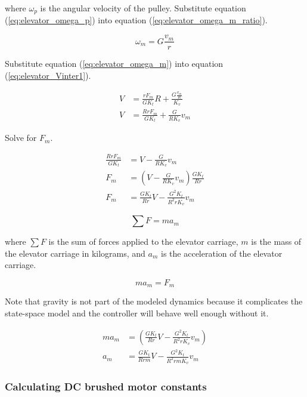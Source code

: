 where $\omega_p$ is the angular velocity of the pulley. Substitute equation
(\ref{eq:elevator_omega_p}) into equation (\ref{eq:elevator_omega_m_ratio}).

\begin{equation}
  \omega_m = G \frac{v_m}{r} \label{eq:elevator_omega_m}
\end{equation}

Substitute equation (\ref{eq:elevator_omega_m}) into equation
(\ref{eq:elevator_Vinter1}).

\begin{align*}
  V &= \frac{rF_m}{GK_t} R + \frac{G \frac{v_m}{R}}{K_v} \\
  V &= \frac{RrF_m}{GK_t} + \frac{G}{RK_v} v_m
\end{align*}

Solve for $F_m$.

\begin{align}
  \frac{RrF_m}{GK_t} &= V - \frac{G}{RK_v} v_m \nonumber \\
  F_m &= \left(V - \frac{G}{RK_v} v_m\right) \frac{GK_t}{Rr} \nonumber \\
  F_m &= \frac{GK_t}{Rr} V - \frac{G^2K_t}{R^2 rK_v} v_m \label{eq:elevator_F_m}
\end{align}

\begin{equation}
  \sum F = ma_m \label{eq:elevator_F_ma}
\end{equation}

where $\sum F$ is the sum of forces applied to the elevator carriage, $m$ is
the mass of the elevator carriage in kilograms, and $a_m$ is the acceleration of
the elevator carriage.

\begin{equation*}
  ma_m = F_m
\end{equation*}

Note that gravity is not part of the modeled dynamics because it complicates the
state-space model and the controller will behave well enough without it.

\begin{align}
  ma_m &= \left(\frac{GK_t}{Rr} V - \frac{G^2K_t}{R^2 rK_v} v_m\right)
    \nonumber \\
  a_m &= \frac{GK_t}{Rrm} V - \frac{G^2K_t}{R^2 rmK_v} v_m
    \label{eq:elevator_accel}
\end{align}

\subsubsection{Calculating DC brushed motor constants}

